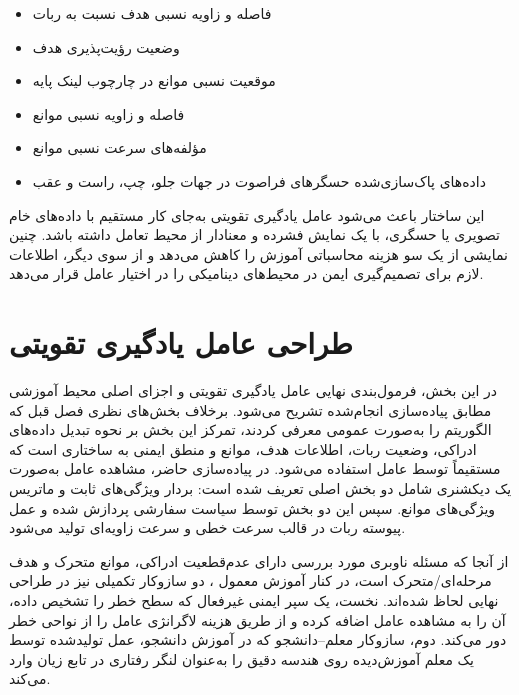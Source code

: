 \begin{itemize}
	\item فاصله و زاویه نسبی هدف نسبت به ربات
	\item وضعیت رؤیت‌پذیری هدف
	\item موقعیت نسبی موانع در چارچوب لینک پایه
	\item فاصله و زاویه نسبی موانع
	\item مؤلفه‌های سرعت نسبی موانع
	\item داده‌های پاک‌سازی‌شده حسگرهای فراصوت در جهات جلو، چپ، راست و عقب
\end{itemize}

این ساختار باعث می‌شود عامل یادگیری تقویتی به‌جای کار مستقیم با داده‌های خام تصویری یا حسگری، با یک نمایش فشرده و معنادار از محیط تعامل داشته باشد. چنین نمایشی از یک سو هزینه محاسباتی آموزش را کاهش می‌دهد و از سوی دیگر، اطلاعات لازم برای تصمیم‌گیری ایمن در محیط‌های دینامیکی را در اختیار عامل قرار می‌دهد.
\section{طراحی عامل یادگیری تقویتی}
\label{sec:rl_agent_design}

در این بخش، فرمول‌بندی نهایی عامل یادگیری تقویتی و اجزای اصلی محیط آموزشی مطابق پیاده‌سازی انجام‌شده تشریح می‌شود. برخلاف بخش‌های نظری فصل قبل که الگوریتم  را به‌صورت عمومی معرفی کردند، تمرکز این بخش بر نحوه تبدیل داده‌های ادراکی، وضعیت ربات، اطلاعات هدف، موانع و منطق ایمنی به ساختاری است که مستقیماً توسط عامل استفاده می‌شود. در پیاده‌سازی حاضر، مشاهده عامل به‌صورت یک دیکشنری شامل دو بخش اصلی تعریف شده است: بردار ویژگی‌های ثابت و ماتریس ویژگی‌های موانع. سپس این دو بخش توسط سیاست سفارشی  پردازش شده و عمل پیوسته ربات در قالب سرعت خطی و سرعت زاویه‌ای تولید می‌شود.

از آنجا که مسئله ناوبری مورد بررسی دارای عدم‌قطعیت ادراکی، موانع متحرک و هدف مرحله‌ای/متحرک است، در کنار آموزش معمول ، دو سازوکار تکمیلی نیز در طراحی نهایی لحاظ شده‌اند. نخست، یک سپر ایمنی غیرفعال%
 که سطح خطر را تشخیص داده، آن را به مشاهده عامل اضافه کرده و از طریق هزینه لاگرانژی عامل را از نواحی خطر دور می‌کند. دوم، سازوکار معلم--دانشجو%
  که در آموزش دانشجو، عمل تولیدشده توسط یک معلم آموزش‌دیده روی هندسه دقیق را به‌عنوان لنگر رفتاری در تابع زیان وارد می‌کند.

